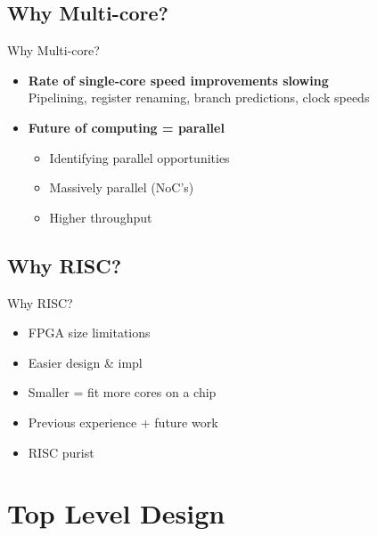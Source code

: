 \documentclass[aspectratio=169]{beamer}
\begin{document}
\subsection{Why Multi-core?}
\begin{frame}{Why Multi-core?}

\begin{itemize}\setlength\itemsep{1em}
    \item{\textbf{Rate of single-core speed improvements slowing}\\
    Pipelining, register renaming, branch predictions, clock speeds
    }
    \item{\textbf{Future of computing = parallel}\\
    \begin{itemize}\setlength\itemsep{1em}
        \item Identifying parallel opportunities
        \item Massively parallel (NoC's)
        \item Higher throughput
    \end{itemize}
    }
\end{itemize}
\end{frame}

\subsection{Why RISC?}
\begin{frame}{Why RISC?}
\begin{itemize}\setlength\itemsep{1em}
    \item FPGA size limitations
    \item Easier design \& impl
    \item Smaller = fit more cores on a chip
    \item Previous experience + future work
    \item RISC purist
\end{itemize}
\end{frame}

\section{Top Level Design}
\frame{\vspace{-1cm}
\tableofcontents[currentsection, subsectionstyle=show/show/hide]}
\end{document}
